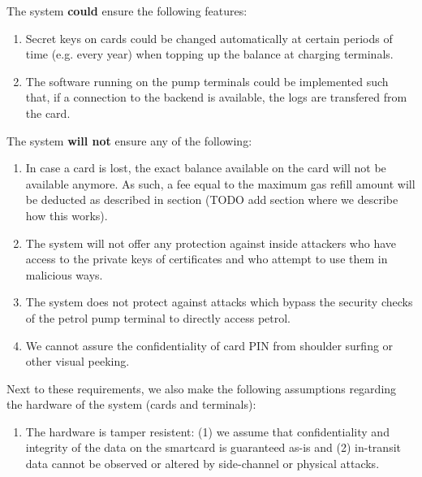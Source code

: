 The system {\bf could} ensure the following features:
\begin{enumerate}
  \item Secret keys on cards could be changed automatically at certain periods of time (e.g. every year) when topping up the balance at charging terminals.
  \item The software running on the pump terminals could be implemented such that, if a connection to the backend is available, the logs are transfered from the card.
\end{enumerate}

The system {\bf will not} ensure any of the following:
\begin{enumerate}
  \item In case a card is lost, the exact balance available on the card will not be available anymore. As such, a fee equal to the maximum gas refill amount will be deducted as described in section (TODO add section where we describe how this works).
  \item The system will not offer any protection against inside attackers who have access to the private keys of certificates and who attempt to use them in malicious ways.
  \item The system does not protect against attacks which bypass the security checks of the petrol pump terminal to directly access petrol.
  \item We cannot assure the confidentiality of card PIN from shoulder surfing or other visual peeking.
\end{enumerate}

Next to these requirements, we also make the following assumptions regarding the hardware of the system (cards and terminals):
\begin{enumerate}
  \item The hardware is tamper resistent: (1) we assume that confidentiality and integrity of the data on the smartcard is guaranteed as-is and (2) in-transit data cannot be observed or altered by side-channel or physical attacks.
\end{enumerate}